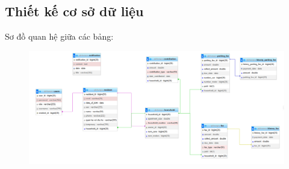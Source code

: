 \documentclass{article}
\begin{document}
\subsection{Thiết kế cơ sở dữ liệu}
Sơ đồ quan hệ giữa các bảng:
\begin{figure}[H]
    \centering
    \includegraphics[width=\linewidth]{Ảnh chương 4/4.2/Database.png}
\end{figure}





    
\end{document}
